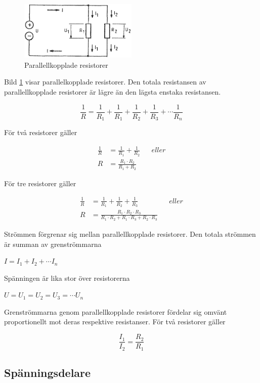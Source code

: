 \begin{figure}
\includegraphics[width=0.5\textwidth]{images/cropped_pdfs/bild_2_3-02.pdf}
\caption{Parallellkopplade resistorer}
\label{fig:BildII3-02}
\end{figure}

Bild \ref{fig:BildII3-02} visar parallelkopplade resistorer.
Den totala resistansen av parallellkopplade resistorer är lägre än den lägsta
enstaka resistansen.

\[
\frac{1}{R} = \frac{1}{R_1} + \frac{1}{R_1} +
\frac{1}{R_2} + \frac{1}{R_3} + \cdots \frac{1}{R_n}
\]

För två resistorer gäller

\begin{align*}
\frac{1}{R} &= \frac{1}{R_1} + \frac{1}{R_2} && eller \\
R &= \frac{R_1 \cdot R_2}{R_1 + R_2}
\end{align*}

För tre resistorer gäller

\begin{align*}
\frac{1}{R} &= \frac{1}{R_1} + \frac{1}{R_2} + \frac{1}{R_3} && eller \\
R &= \frac{R_1\cdot R_2\cdot R_3}{R_1\cdot R_2 + R_1\cdot R_3 + R_2\cdot R_3}
\end{align*}

Strömmen förgrenar sig mellan parallellkopplade resistorer.
Den totala strömmen är summan av grenströmmarna

\( I = I_1 + I_2 + \cdots I_n \)

Spänningen är lika stor över resistorerna

\(U = U_1 = U_2 = U_3 = \cdots U_n \)

Grenströmmarna genom parallellkopplade resistorer fördelar sig omvänt
proportionellt mot deras respektive resistanser.
För två resistorer gäller

\[\frac{I_1}{I_2} = \frac{R_2}{R_1}\]

\subsection{Spänningsdelare}

